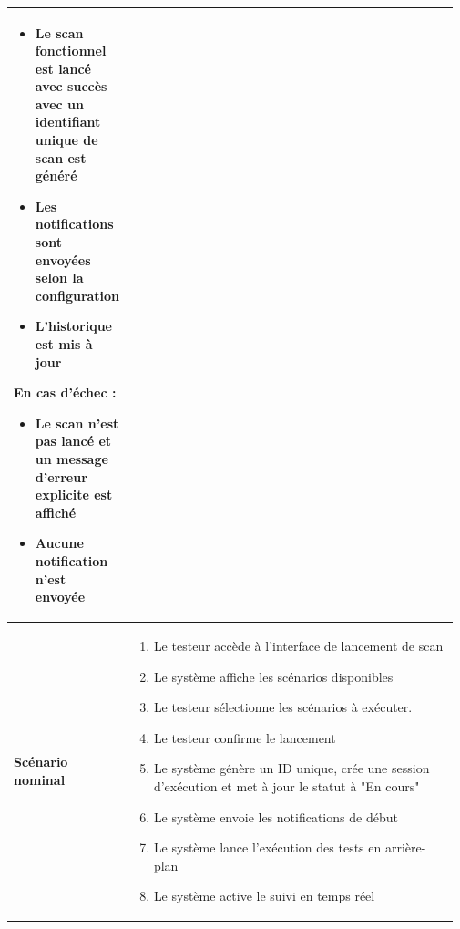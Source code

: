 \begin{spacing}{1}
\begin{longtable}{|p{0.12\linewidth}|p{0.85\linewidth}|}
\begin{minipage}{0.83\textwidth}
\begin{itemize}[left=0cm]
                                \item[\textbullet] Le scan fonctionnel est lancé avec succès avec un identifiant unique de scan est généré
                                \item[\textbullet] Les notifications sont envoyées selon la configuration
                                \item[\textbullet] L'historique est mis à jour
                            \end{itemize}
                            \textbf{En cas d'échec :}
                            \begin{itemize}[left=0cm]
                                \item[\textbullet] Le scan n'est pas lancé et un message d'erreur explicite est affiché
                                \item[\textbullet] Aucune notification n'est envoyée
                            \end{itemize}
                            \vspace{0.1cm}
                        \end{minipage} \\
                        \hline
                        \textbf{Scénario nominal} & 
                        \begin{minipage}{0.83\textwidth}
                            \vspace{0.1cm}
                            \begin{enumerate}[label=\arabic*.]
                                \item Le testeur accède à l'interface de lancement de scan
                                \item Le système affiche les scénarios disponibles
                                \item Le testeur sélectionne les scénarios à exécuter.
                                \item Le testeur confirme le lancement
                                \item Le système génère un ID unique, crée une session d'exécution et met à jour le statut à "En cours"
                                \item Le système envoie les notifications de début
                                \item Le système lance l'exécution des tests en arrière-plan
                                \item Le système active le suivi en temps réel

\end{enumerate}
\end{minipage}
\end{longtable}
\end{spacing}
